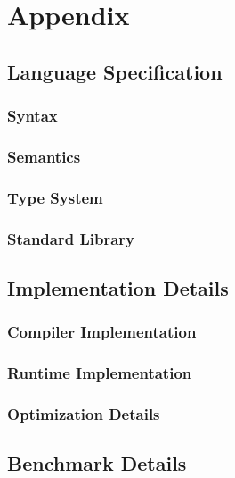 \chapter{Appendix}

\section{Language Specification}

\subsection{Syntax}

\subsection{Semantics}

\subsection{Type System}

\subsection{Standard Library}

\section{Implementation Details}

\subsection{Compiler Implementation}

\subsection{Runtime Implementation}

\subsection{Optimization Details}

\section{Benchmark Details}

